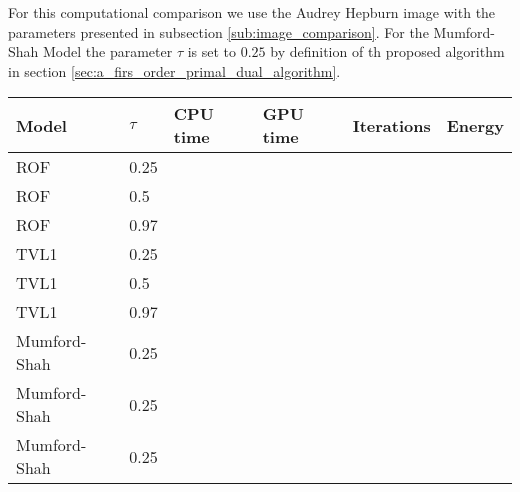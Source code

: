         For this computational comparison we use the Audrey Hepburn image with the parameters presented in subsection \ref{sub:image_comparison}. For the Mumford-Shah Model the parameter $\tau$ is set to $0.25$ by definition of th proposed algorithm in section \ref{sec:a_firs_order_primal_dual_algorithm}.
        \begin{center}
            \begin{tabular}{| l | l | l | l | l | l |}
            \hline
            Model & $\tau$ & CPU time & GPU time & Iterations & Energy  \\ \hline
            ROF & 0.25 &  &  &  &  \\ \hline
            ROF & 0.5 &  &  &  &  \\ \hline
            ROF & 0.97 &  &  &  &  \\ \hline
            TVL1 & 0.25 &  &  &  &  \\ \hline
            TVL1 & 0.5 &  &  &  &  \\ \hline
            TVL1 & 0.97 &  &  &  &  \\ \hline
            Mumford-Shah & 0.25 &  &  &  &  \\ \hline
            Mumford-Shah & 0.25 &  &  &  &  \\ \hline
            Mumford-Shah & 0.25 &  &  &  &  \\ \hline
            \end{tabular}
        \end{center}


